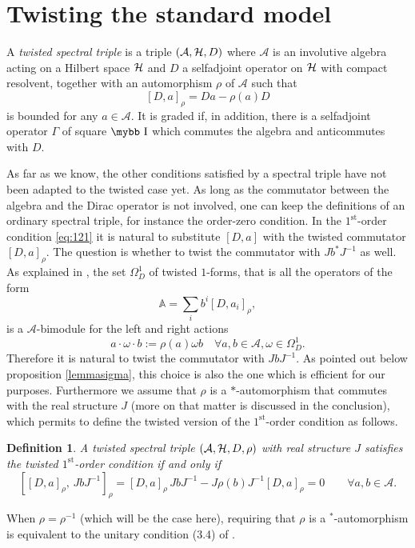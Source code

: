 \documentclass[11pt]{article}
\newcommand{\A}{\mathcal A}
\def\bb#1{\hbox{\mybb#1}}
\newtheorem{df}[prop]{Definition}
\begin{document}
\section{Twisting the standard model}\setcounter{equation}{0}
\label{section:twisting}

A \emph{twisted spectral triple}
is a triple $(\A, {\cal H}, D)$ where $\A$ is an involutive algebra
acting on a Hilbert space $\cal H$ and $D$ a selfadjoint operator on
$\cal H$ with compact resolvent,  together with an automorphism $\rho$ of $\A$ such that
\begin{equation}
  \label{eq:84}
  [D, a]_\rho = Da -\rho(a)D
\end{equation}
is bounded for any $a\in \A$. It is graded if, in addition, there is
a selfadjoint  operator $\Gamma$ of square $\bb I$ which commutes the algebra and
anticommutes with $D$.




As far as we know, the other conditions satisfied by a spectral triple
have not been adapted to the twisted case yet. As long as the
commutator between the algebra and the Dirac operator is not involved,
 one can keep the definitions
of an ordinary spectral triple,  for instance the order-zero
condition. In the $1^{\text{st}}$-order
condition \eqref{eq:121} it is natural to
substitute $[D,a]$ with the twisted commutator $[D,
a]_\rho$. The question is whether to twist the commutator with $J b^*
J^{-1}$ as well. As explained in \cite[Prop. 3.4]{Connes:1938fk}, the set $\Omega^1_D $ of twisted $1$-forms, that is
all the operators of the form
\begin{equation}
  \label{eq:167}
 \mathbb A = \sum_i b^i [D, a_i]_\rho,
\end{equation}
is a $\A$-bimodule for the left and right  actions
\begin{equation}
  \label{eq:182}
  a\cdot\omega\cdot b := \rho(a) \omega b \quad \forall a,b\in\A,
  \omega\in \Omega^1_D.
\end{equation}
Therefore it is natural to
twist the commutator with $JbJ^{-1}$. As pointed out below
proposition \ref{lemmasigma},  this choice
is also the one which is efficient for our purposes. Furthermore we
assume that $\rho$ is a $*$-automorphism that commutes with the real
structure $J$ (more on that matter is discussed in the conclusion), which permits to define the twisted version of the
$1^\text{st}$-order condition as follows.
\begin{df}
\label{deftwistedfirstorder}
 A twisted spectral triple $({\cal A}, {\cal H}, D, \rho)$ with real
 structure $J$ satisfies the twisted $1^\text{st}$-order condition if and
 only if
 \begin{equation}
   \label{eq:112}
  [ [D, a]_\rho,\, JbJ^{-1}]_\rho =    [D, a]_\rho\, JbJ^{-1} - J
  \rho(b) J^{-1}  [D, a]_\rho =  0 \quad\quad \forall a, b\in \A.
 \end{equation}
\end{df}
\noindent When $\rho=\rho^{-1}$ (which will be the case here), requiring that
$\rho$ is a $^*$-automorphism is equivalent to the unitary condition
(3.4) of \cite{Connes:1938fk}.
 
\end{document}
